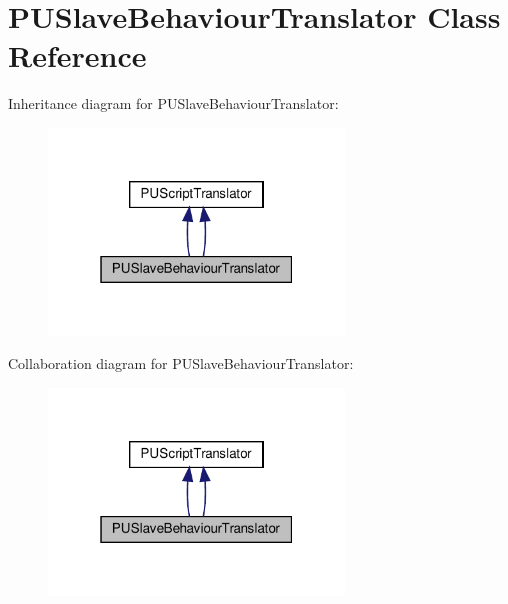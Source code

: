\hypertarget{classPUSlaveBehaviourTranslator}{}\section{P\+U\+Slave\+Behaviour\+Translator Class Reference}
\label{classPUSlaveBehaviourTranslator}


Inheritance diagram for P\+U\+Slave\+Behaviour\+Translator\+:
\nopagebreak
\begin{figure}[H]
\begin{center}
\leavevmode
\includegraphics[width=223pt]{classPUSlaveBehaviourTranslator__inherit__graph}
\end{center}
\end{figure}


Collaboration diagram for P\+U\+Slave\+Behaviour\+Translator\+:
\nopagebreak
\begin{figure}[H]
\begin{center}
\leavevmode
\includegraphics[width=223pt]{classPUSlaveBehaviourTranslator__coll__graph}
\end{center}
\end{figure}
